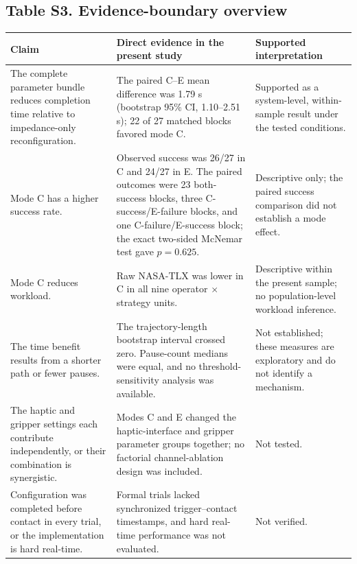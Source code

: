 \documentclass[11pt]{article}
\begin{document}
\subsection*{Table S3. Evidence-boundary overview}
\small
\renewcommand{\arraystretch}{1.18}
\begin{tabular}{p{}p{}p{}}
\toprule
Claim & Direct evidence in the present study & Supported interpretation \\
\midrule
The complete parameter bundle reduces completion time relative to impedance-only reconfiguration. & The paired C--E mean difference was 1.79 s (bootstrap 95\% CI, 1.10--2.51 s); 22 of 27 matched blocks favored mode C. & Supported as a system-level, within-sample result under the tested conditions. \\
\addlinespace[2pt]
Mode C has a higher success rate. & Observed success was 26/27 in C and 24/27 in E. The paired outcomes were 23 both-success blocks, three C-success/E-failure blocks, and one C-failure/E-success block; the exact two-sided McNemar test gave $p=0.625$. & Descriptive only; the paired success comparison did not establish a mode effect. \\
\addlinespace[2pt]
Mode C reduces workload. & Raw NASA-TLX was lower in C in all nine operator $\times$ strategy units. & Descriptive within the present sample; no population-level workload inference. \\
\addlinespace[2pt]
The time benefit results from a shorter path or fewer pauses. & The trajectory-length bootstrap interval crossed zero. Pause-count medians were equal, and no threshold-sensitivity analysis was available. & Not established; these measures are exploratory and do not identify a mechanism. \\
\addlinespace[2pt]
The haptic and gripper settings each contribute independently, or their combination is synergistic. & Modes C and E changed the haptic-interface and gripper parameter groups together; no factorial channel-ablation design was included. & Not tested. \\
\addlinespace[2pt]
Configuration was completed before contact in every trial, or the implementation is hard real-time. & Formal trials lacked synchronized trigger--contact timestamps, and hard real-time performance was not evaluated. & Not verified. \\
\bottomrule
\end{tabular}
\normalsize
\end{document}

